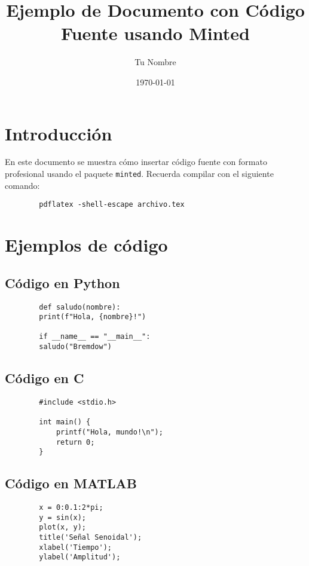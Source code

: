 \documentclass[12pt,a4paper]{article}
\title{Ejemplo de Documento con Código Fuente usando Minted}
\author{Tu Nombre}
\date{\today}
\begin{document}
	
	\maketitle
	\tableofcontents
	\newpage
	
	\section{Introducción}
	
	En este documento se muestra cómo insertar código fuente con formato profesional usando el paquete \texttt{minted}.  
	Recuerda compilar con el siguiente comando:
	
	\begin{verbatim}
		pdflatex -shell-escape archivo.tex
	\end{verbatim}
	
	\section{Ejemplos de código}
	
	\subsection{Código en Python}
	\begin{verbatim}
		def saludo(nombre):
		print(f"Hola, {nombre}!")
		
		if __name__ == "__main__":
		saludo("Bremdow")
	\end{verbatim}
	
	\subsection{Código en C}
	\begin{verbatim}
		#include <stdio.h>
		
		int main() {
			printf("Hola, mundo!\n");
			return 0;
		}
	\end{verbatim}
	
	\subsection{Código en MATLAB}
	\begin{verbatim}
		x = 0:0.1:2*pi;
		y = sin(x);
		plot(x, y);
		title('Señal Senoidal');
		xlabel('Tiempo');
		ylabel('Amplitud');
	\end{verbatim}
	
\end{document}
